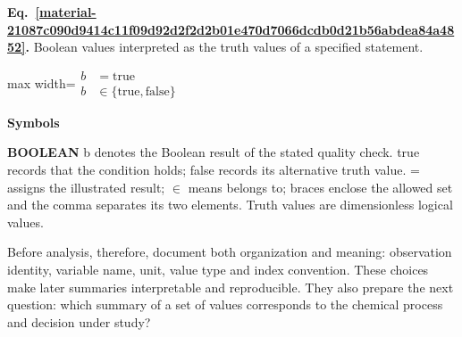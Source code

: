 \documentclass[11pt,a4paper]{article}
\begin{document}
\par\medskip
\begin{samepage}
\label{material-21087c090d9414c11f09d92d2f2d2b01e470d7066dcdb0d21b56abdea84a4852}
\noindent\textbf{Eq.~\ref*{material-21087c090d9414c11f09d92d2f2d2b01e470d7066dcdb0d21b56abdea84a4852}.} Boolean values interpreted as the truth values of a specified statement.\par\nopagebreak
\begin{center}\begin{adjustbox}{max width=\linewidth}$\displaystyle \begin{aligned}b&=\mathrm{true}\\b&\in\{\mathrm{true},\mathrm{false}\}\end{aligned}$\end{adjustbox}\end{center}

\par\noindent\textbf{Symbols}

\par\noindent\textbf{BOOLEAN} b denotes the Boolean result of the stated quality check. true records that the condition holds; false records its alternative truth value. = assigns the illustrated result; \ensuremath{\in} means belongs to; braces enclose the allowed set and the comma separates its two elements. Truth values are dimensionless logical values.

\end{samepage}
\medskip

Before analysis, therefore, document both organization and meaning: observation identity, variable name, unit, value type and index convention. These choices make later summaries interpretable and reproducible. They also prepare the next question: which summary of a set of values corresponds to the chemical process and decision under study?
\end{document}
